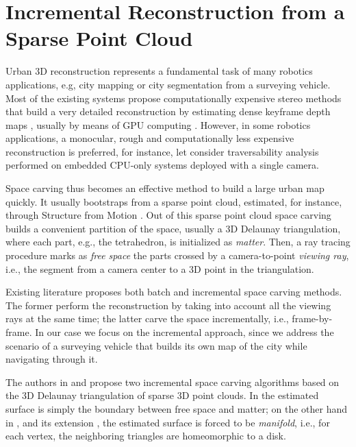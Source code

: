 \chapter{Incremental Reconstruction from a Sparse Point Cloud}

Urban 3D reconstruction represents a fundamental task of many robotics applications, e.g, city mapping \cite{pollefeys_et_al_08} or city segmentation \cite{Hane_et_al_09} from a surveying vehicle.
Most of the existing systems propose computationally expensive stereo methods that build a very detailed reconstruction by estimating dense keyframe depth maps , usually by means of GPU computing \cite{pollefeys_et_al_08,Cornelis_et_al08}. 
However, in some robotics applications, a monocular, rough and computationally less expensive reconstruction is preferred,  for instance, let consider traversability analysis performed on embedded CPU-only systems deployed with a single camera.

Space carving \cite{seitz_et_al06} thus becomes an effective method to build  a large urban map quickly. 
It usually bootstraps from a sparse point cloud, estimated, for instance, through Structure from Motion \cite{Snavely_et_al06}. 
Out of this sparse point cloud space carving builds a convenient partition of the space, usually a 3D Delaunay triangulation, where each part, e.g., the tetrahedron, is initialized as \emph{matter}.
Then, a ray tracing procedure marks as \emph{free space} the parts  crossed by a camera-to-point \emph{viewing ray}, i.e., the segment from a camera center to a 3D point in the triangulation. 

Existing literature proposes both batch \cite{Pan_et_al09} and incremental \cite{litvinov_lhuillier_13,lovi_et_al_11} space carving methods.
The former perform the reconstruction by taking into account all the viewing rays at the same time; the latter carve the space incrementally, i.e., frame-by-frame.
In our case we focus on the incremental approach, since we address the scenario of a surveying vehicle that builds its own map of the city while navigating through it.

The authors in \cite{lovi_et_al_11}  and \cite{litvinov_lhuillier_13} propose two incremental space carving algorithms based on the 3D Delaunay triangulation of sparse 3D point clouds. 
In \cite{lovi_et_al_11} the estimated surface is simply the boundary between free space and matter; on the other hand in \cite{litvinov_lhuillier_13}, and its extension \cite{litvinov_Lhiuller14}, the estimated surface is forced to be \emph{manifold}, i.e., for each vertex, the neighboring triangles are homeomorphic to a disk. 


